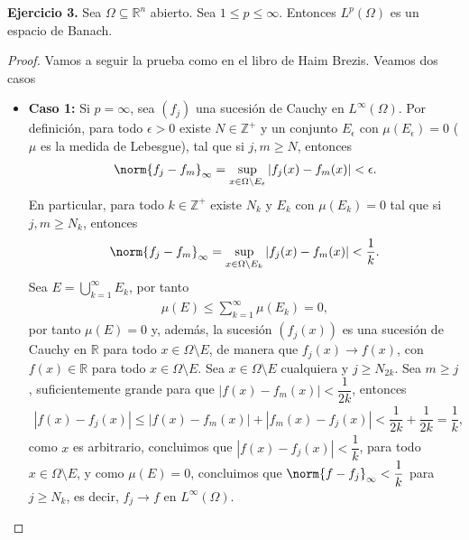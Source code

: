 \textbf{Ejercicio 3.} Sea $\Omega\subseteq \mathbb{R}^n$ abierto. Sea $1\leq p\leq \infty$. Entonces $L^p(\Omega)$ es un espacio de Banach.

\begin{proof}
    Vamos a seguir la prueba como en el libro de Haim Brezis. Veamos dos casos
    \begin{itemize}
        \item \textbf{Caso 1:} Si $p=\infty$, sea $(f_j)$ una sucesión de Cauchy en $L^\infty(\Omega)$. Por definición, para todo $\epsilon>0$ existe $N\in \mathbb{Z}^+$ y un conjunto $E_\epsilon$ con $\mu(E_\epsilon)=0$ ($\mu$ es la medida de Lebesgue), tal que si $j,m\geq N$, entonces 
        \begin{align*}
            \norm{f_j-f_m}_\infty=\sup_{x\in \Omega\setminus E_\epsilon}|f_j(x)-f_m(x)|<\epsilon.
        \end{align*}
        En particular, para todo $k \in \mathbb{Z}^+$ existe $N_k$ y $E_k$ con $\mu(E_k)=0$ tal que si $j,m\geq N_k$, entonces
        \begin{align*}
            \norm{f_j-f_m}_\infty=\sup_{x \in\Omega\setminus E_k}|f_j(x)-f_m(x)|<\dfrac{1}{k}.
        \end{align*}
        Sea $\displaystyle E=\bigcup_{k=1}^\infty E_k$, por tanto
        \begin{align*}
            \mu(E)\leq \sum_{k=1}^\infty\mu(E_k)=0,
        \end{align*}
        por tanto $\mu(E)=0$ y, además, la sucesión $(f_j(x))$ es una sucesión de Cauchy en $\mathbb{R}$ para todo $x\in \Omega\setminus E$, de manera que $f_j(x)\to f(x)$, con $f(x)\in \mathbb{R}$ para todo $x \in \Omega\setminus E$. Sea $x \in \Omega\setminus E$ cualquiera y $j\geq N_{2k}$. Sea $m\geq j$, suficientemente grande para que $|f(x)-f_m(x)|<\dfrac{1}{2k}$, entonces
        \begin{align*}
            |f(x)-f_j(x)|\leq |f(x)-f_m(x)|+|f_m(x)-f_j(x)|<\dfrac{1}{2k}+\dfrac{1}{2k}=\dfrac{1}{k},
        \end{align*}
        como $x$ es arbitrario, concluimos que $|f(x)-f_j(x)|<\dfrac{1}{k}$, para todo $x \in \Omega\setminus E$, y como $\mu(E)=0$, concluimos que $\norm{f-f_j}_\infty<\dfrac{1}{k}$ para $j\geq N_k$, es decir, $f_j\to f$ en $L^\infty(\Omega)$.


\end{itemize}
\end{proof}
